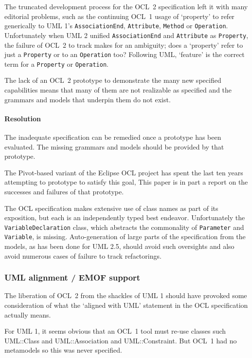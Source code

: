 \documentclass{jot}
\begin{document}
The truncated development process for the OCL~2 specification left it with many editorial problems, such as the continuing OCL~1 usage of `property' to refer generically to UML 1's \verb$AssociationEnd$, \verb$Attribute$, \verb$Method$ or \verb$Operation$. Unfortunately when UML 2 unified \verb$AssociationEnd$ and \verb$Attribute$ as \verb$Property$, the failure of OCL~2 to track makes for an ambiguity; does a `property' refer to just a \verb$Property$ or to an \verb$Operation$ too? Following UML, `feature' is the correct term for a \verb$Property$ or \verb$Operation$.

The lack of an OCL~2 prototype to demonstrate the many new specified capabilities means that many of them are not realizable as specified and the grammars and models that underpin them do not exist.

\paragraph{Resolution} The inadequate specification can be remedied once a prototype has been evaluated. The missing grammars and models should be provided by that prototype.

The Pivot-based variant of the Eclipse OCL project has spent the last ten years attempting to prototype to satisfy this goal, This paper is in part a report on the successes and failures of that prototype.

The OCL specification makes extensive use of class names as part of its exposition, but each is an independently typed best endeavor. Unfortunately the \verb$VariableDeclaration$ class, which abstracts the commonality of \verb$Parameter$ and \verb$Variable$, is missing. Auto-generation of large parts of the specification from the models, as has been done for UML 2.5, should avoid such oversights and also avoid numerous cases of failure to track refactorings.

\subsubsection{UML alignment / EMOF support}

The liberation of OCL~2 from the shackles of UML 1 should have provoked some consideration of what the `aligned with UML' statement in the OCL specification actually means.

For UML 1, it seems obvious that an OCL~1 tool must re-use classes such UML::Class and UML::Association and UML::Constraint. But OCL~1 had no metamodels so this was never specified.
\end{document}
